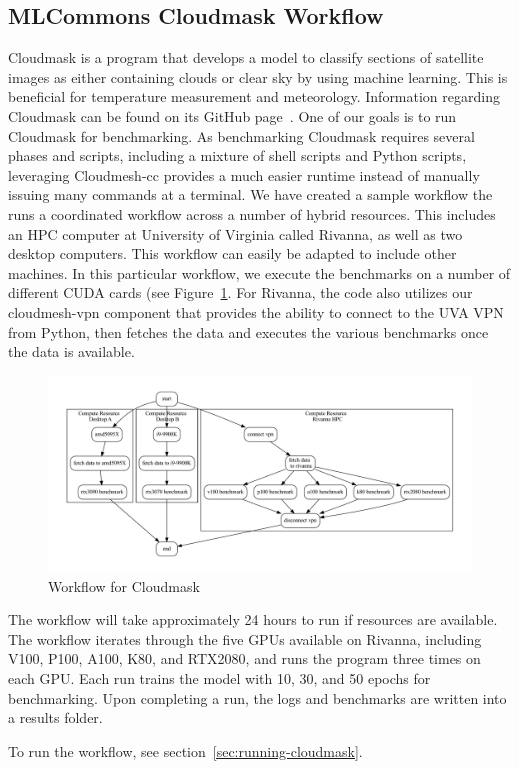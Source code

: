 
\subsection{MLCommons Cloudmask Workflow}
\label{cloudmask-workflow}

Cloudmask is a program that develops a model to classify sections of
satellite images as either containing clouds or clear sky by using
machine learning. This is beneficial for temperature measurement and
meteorology.  Information regarding Cloudmask can be found on its
GitHub page~\cite{www-cloudmask}.  One of our goals is to run
Cloudmask for benchmarking.  As benchmarking Cloudmask requires
several phases and scripts, including a mixture of shell scripts and
Python scripts, leveraging Cloudmesh-cc provides a much easier runtime
instead of manually issuing many commands at a terminal.  We have
created a sample workflow the runs a coordinated workflow across a
number of hybrid resources. This includes an HPC computer at
University of Virginia called Rivanna, as well as two desktop
computers. This workflow can easily be adapted to include other machines. In this
particular workflow, we execute the benchmarks on a number of
different CUDA cards (see Figure~\ref{fig:cloudmaskwf}. For Rivanna,
the code also utilizes our cloudmesh-vpn component that provides the
ability to connect to the UVA VPN from Python, then fetches the data
and executes the various benchmarks once the data is available.

\begin{figure}[htb]
\centering
\includegraphics[width=1.0\columnwidth]{images/cloudmask-wf.pdf}
\vspace{-1cm}
\caption{Workflow for Cloudmask}\label{fig:cloudmaskwf}
\end{figure}

The workflow will take approximately 24 hours to run if resources are
available. The workflow iterates through the five GPUs available on
Rivanna, including V100, P100, A100, K80, and RTX2080, and runs the program
three times on each GPU. Each run trains the model with 10, 30, and 50
epochs for benchmarking. Upon completing a run, the logs and
benchmarks are written into a results folder.

To run the workflow, see section~\ref{sec:running-cloudmask}.


